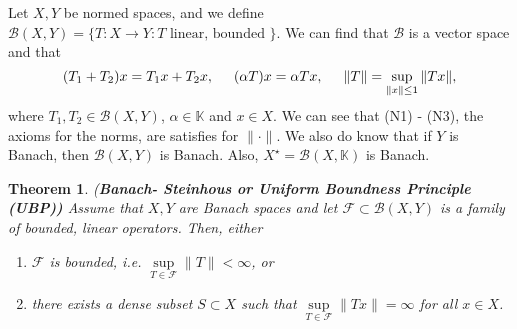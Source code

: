 \documentclass[12pt]{article}
\newtheorem{theorem}{Theorem}
\def\K{\mathbb{K}}
\newcommand{\F}{{\mathscr F}}
\newcommand{\B}{\mathscr{B}}
\newcommand{\sbs}{\subset}
\newcommand{\Xs}{X^{\star}}
\begin{document}
 Let $X, Y$ be normed spaces, and we define $\B(X, Y) = \{ T: X \to Y : T \text{ linear, bounded } \}$. We can find that $\B$ is a vector space and that 
 \[ (T_1 + T_2) x = T_1x + T_2 x, \hspace{5mm} (\alpha T)x = \alpha Tx, \hspace{5mm} \| T \| = \sup\limits_{\| x \| \leq 1} \| Tx \|,\]
 where $T_1, T_2 \in \B(X, Y)$, $\alpha \in \K$ and $x \in X$. We can see that (N1) - (N3), the axioms for the norms, are satisfies for $\| \cdot \|$. We also do know that if $Y$ is Banach, then $\B(X, Y)$ is Banach. Also, $\Xs = \B(X, \K)$ is Banach. 
 \begin{theorem} (\textbf{Banach- Steinhous or Uniform Boundness Principle (UBP))}
 Assume that $X, Y$ are Banach spaces and let $\F \sbs \B(X, Y)$ is a family of bounded, linear operators. Then, either 
 \begin{enumerate}[topsep=-15pt, itemsep=0pt]
 \item[(a)] $\F$ is bounded, i.e. $\sup\limits_{T \in \F} \| T \| < \infty$, or
 \item[(b)] there exists a dense subset $S \sbs X$ such that 
 $\sup\limits_{T \in \F} \| T x \| = \infty$ for all $x \in X$.  
 \end{enumerate}
 \end{theorem}
 \vspace{-25pt}
\end{document}
